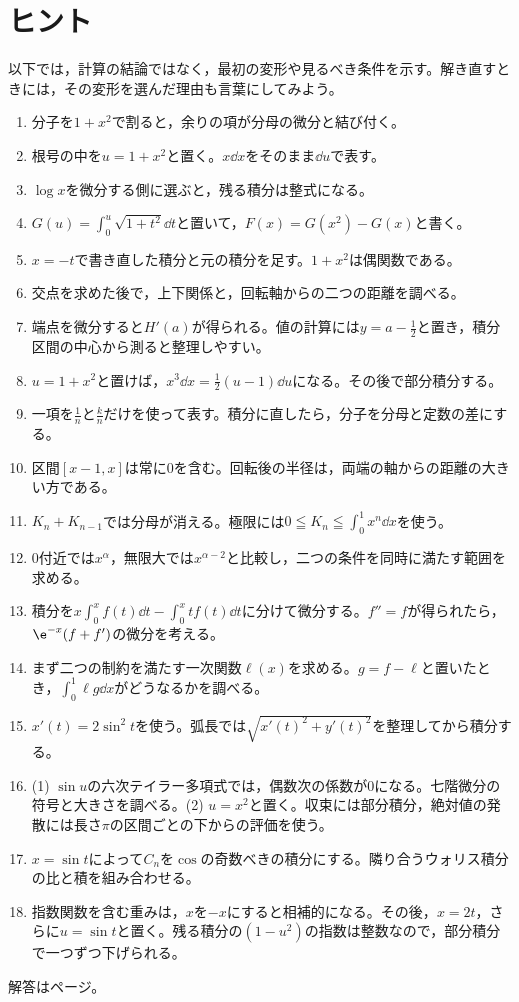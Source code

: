 \section{ヒント}\label{節:総合ヒント}

以下では，計算の結論ではなく，最初の変形や見るべき条件を示す。解き直すときには，その変形を選んだ理由も言葉にしてみよう。

\begin{enumerate}[label=\textbf{\thechapter.\arabic*},leftmargin=*]
 \item 分子を$1+x^2$で割ると，余りの項が分母の微分と結び付く。
 \item 根号の中を$u=1+x^2$と置く。$x\dd x$をそのまま$\dd u$で表す。
 \item $\log x$を微分する側に選ぶと，残る積分は整式になる。
 \item $G(u)=\int_0^u\sqrt{1+t^2}\dd t$と置いて，$F(x)=G(x^2)-G(x)$と書く。
 \item $x=-t$で書き直した積分と元の積分を足す。$1+x^2$は偶関数である。
 \item 交点を求めた後で，上下関係と，回転軸からの二つの距離を調べる。
 \item 端点を微分すると$H'(a)$が得られる。値の計算には$y=a-\frac12$と置き，積分区間の中心から測ると整理しやすい。
 \item $u=1+x^2$と置けば，$x^3\dd x=\frac12(u-1)\dd u$になる。その後で部分積分する。
 \item 一項を$\frac1n$と$\frac{k}{n}$だけを使って表す。積分に直したら，分子を分母と定数の差にする。
 \item 区間$[x-1,x]$は常に$0$を含む。回転後の半径は，両端の軸からの距離の大きい方である。
 \item $K_n+K_{n-1}$では分母が消える。極限には$0\leqq K_n\leqq\int_0^1x^n\dd x$を使う。
 \item $0$付近では$x^\alpha$，無限大では$x^{\alpha-2}$と比較し，二つの条件を同時に満たす範囲を求める。
 \item 積分を$x\int_0^xf(t)\dd t-\int_0^xtf(t)\dd t$に分けて微分する。$f''=f$が得られたら，$\e^{-x}(f+f')$の微分を考える。
 \item まず二つの制約を満たす一次関数$\ell(x)$を求める。$g=f-\ell$と置いたとき，$\int_0^1\ell g\dd x$がどうなるかを調べる。
 \item $x'(t)=2\sin^2t$を使う。弧長では$\sqrt{x'(t)^2+y'(t)^2}$を整理してから積分する。
 \item (1) $\sin u$の六次テイラー多項式では，偶数次の係数が$0$になる。七階微分の符号と大きさを調べる。(2) $u=x^2$と置く。収束には部分積分，絶対値の発散には長さ$\pi$の区間ごとの下からの評価を使う。
 \item $x=\sin t$によって$C_n$を$\cos$の奇数べきの積分にする。隣り合うウォリス積分の比と積を組み合わせる。
 \item 指数関数を含む重みは，$x$を$-x$にすると相補的になる。その後，$x=2t$，さらに$u=\sin t$と置く。残る積分の$(1-u^2)$の指数は整数なので，部分積分で一つずつ下げられる。
\end{enumerate}

\smallskip\noindent 解答は\pageref{解答:第12章}ページ。
